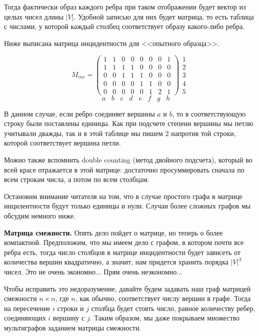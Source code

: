 	Тогда фактически образ каждого ребра при таком отображении будет вектор из целых чисел длины $|V|$. Удобной записью для них будет матрица, то есть таблица с числами, у которой каждый столбец соответствует образу какого-либо ребра.
		
	Ниже выписана матрица инцидентности для <<опытного образца>>.
		
\[	
	M_{inc} =
	\begin{pmatrix} 
	1 & 1 & 0 & 0 & 0 & 0 & 0 & 1 \\
	1 & 1 & 1 & 1 & 0 & 0 & 0 & 0 \\
	0 & 0 & 1 & 1 & 1 & 0 & 0 & 0 \\
	0 & 0 & 0 & 0 & 1 & 1 & 0 & 0 \\
	0 & 0 & 0 & 0 & 0 & 1 & 2 & 1 
	\end{pmatrix}
	\begin{array}{lr}
	1\\  
	2\\
	3\\
	4\\
	5
	\end{array}
\]
$$\; \; \; \; \; \, \, a \; \; \; b \; \; \; c \; \; \; d \; \; \; e \; \; \; f \; \; \; g \; \; \; h $$

	В данном случае, если ребро соединяет вершины $a$ и $b$, то в соответствующую строку были поставлены единицы. Как при подсчете степени вершины мы петлю учитывали дважды, так и в этой таблице мы пишем $2$ напротив той строки, которой соответствует вершина петли.
	
	Можно также вспомнить double counting (метод двойного подсчета), который во всей красе отражается в этой матрице: достаточно просуммировать сначала по всем строкам числа, а потом по всем столбцам.

	Остановим внимание читателя на том, что в случае простого графа в матрице инцилентности будут только единицы и нули. Случаи более сложных графов мы обсудим немного ниже.
	
	\textbf{Матрица смежности.} Опять дело пойдет о матрице, но теперь о более компактной. Предположим, что мы имеем дело с графом, в котором почти все ребра есть, тогда число столбцов в матрице инцидентности будет зависеть от количества вершин квадратично, а значит, нам придется хранить порядка $|V|^3$ чисел. Это не очень экономно... Прям очень неэкономно...
	
	Чтобы исправить это недоразумение, давайте будем задавать наш граф матрицей смежности $n \times n$, где $n$, как обычно, соответствует числу вершин в графе. Тогда на пересечение $i$ строки и $j$ столбца будет стоять число, равное количеству ребер, соединяющих $i$ вершину с $j$. Таким образом, мы даже покрываем множество мультиграфов заданием матрицы смежности.
	
